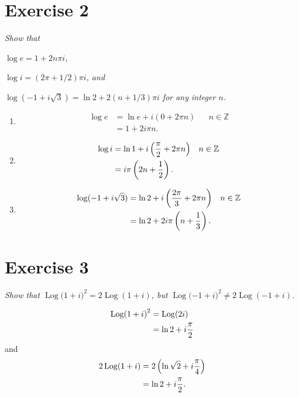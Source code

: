 \documentclass{tufte-handout}
\DeclareMathOperator{\Log}{Log}
\begin{document}
\section{Exercise 2}

\emph{Show that}
\begin{enumerate*}[label=\emph{(\alph*)}]
\item \emph{$\log e = 1 + 2 n \pi i$,}
\item \emph{$\log i = (2 \pi + 1/2) \pi i$, and}
\item \emph{$\log(-1 + i \sqrt 3) = \ln 2 + 2(n + 1/3)\pi i$ for any
    integer $n$.}
\end{enumerate*}

\bigskip

\begin{enumerate}[label=(\alph*)]
\item
  \begin{align*}
    \log e &= \ln e + i (0 + 2 \pi n) && n \in \mathbb{Z}\\
           &= 1 + 2 i \pi n.
  \end{align*}
\item
  \begin{align*}
    \log i &= \ln 1 + i \left( {\pi \over 2} + 2 \pi n \right) && n
                                                                  \in
                                                                  \mathbb{Z}\\
    &= i \pi \left(2n + {1 \over 2} \right).
  \end{align*}
\item
  \begin{align*}
    \log(-1 + i \sqrt 3) &= \ln 2 + i \left({2 \pi \over 3} + 2 \pi n
                           \right) && n \in \mathbb{Z}\\
                         &= \ln 2 + 2 i \pi \left( n + {1 \over 3}\right).
  \end{align*}
\end{enumerate}

\section{Exercise 3}

\emph{Show that $\Log(1 + i{)}^2 = 2 \Log(1 + i)$, but
  $\Log(-1 + i{)}^2 \neq 2 \Log(-1 + i)$.}

\bigskip

\begin{align*}
  \Log(1 + i{)}^2 &= \Log(2i)\\
                  &= \ln 2 + i {\pi \over 2}
\end{align*}
and
\begin{align*}
  2\Log(1 + i) &= 2 \left(\ln \sqrt 2 + i {\pi \over 4} \right)\\
               &= \ln 2 + i {\pi \over 2}.
\end{align*}
\end{document}
